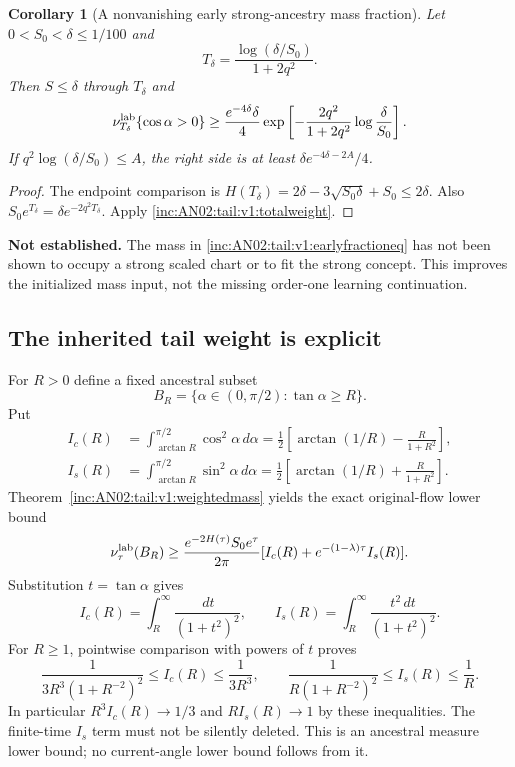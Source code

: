 \documentclass[11pt]{article}
\numberwithin{equation}{section}
\newtheorem{corollary}[theorem]{Corollary}
\theoremstyle{remark}\newtheorem{remark}[theorem]{Remark}
\newcommand{\dd}{\,d}
\newcommand{\1}{\mathbf 1}
\newcommand{\gap}[1]{\par\noindent\textbf{Not established.} #1\par\smallskip}
\begin{document}
\begin{corollary}[A nonvanishing early strong-ancestry mass fraction]
\label{inc:AN02:tail:v1:earlyfraction}
Let $0<S_0<\delta\le1/100$ and
\[
 T_\delta=\frac{\log(\delta/S_0)}{1+2q^2}.
\]
Then $S\le\delta$ through $T_\delta$ and
\begin{equation}\label{inc:AN02:tail:v1:earlyfractioneq}
 \nu_{T_\delta}^{\rm lab}\{\cos\alpha>0\}
 \ge\frac{e^{-4\delta}\delta}{4}
 \exp\left[-\frac{2q^2}{1+2q^2}\log\frac\delta{S_0}\right].
\end{equation}
If $q^2\log(\delta/S_0)\le A$, the right side is at least
$\delta e^{-4\delta-2A}/4$.
\end{corollary}
\begin{proof}
The endpoint comparison is
$H(T_\delta)=2\delta-3\sqrt{S_0\delta}+S_0\le2\delta$.
Also $S_0e^{T_\delta}=\delta e^{-2q^2T_\delta}$.
Apply \eqref{inc:AN02:tail:v1:totalweight}.
\end{proof}
\gap{The mass in \eqref{inc:AN02:tail:v1:earlyfractioneq} has not been shown
to occupy a strong scaled chart or to fit the strong concept. This improves
the initialized mass input, not the missing order-one learning continuation.}

\subsection{The inherited tail weight is explicit}
For $R>0$ define a fixed ancestral subset
\[
 B_R=\{\alpha\in(0,\pi/2):\tan\alpha\ge R\}.
\]
Put
\begin{align}
 I_c(R)&=\int_{\arctan R}^{\pi/2}\cos^2\alpha\dd\alpha
 =\frac12\left[\arctan(1/R)-\frac{R}{1+R^2}\right],\label{inc:AN02:tail:v1:Ic}\\
 I_s(R)&=\int_{\arctan R}^{\pi/2}\sin^2\alpha\dd\alpha
 =\frac12\left[\arctan(1/R)+\frac{R}{1+R^2}\right].\label{inc:AN02:tail:v1:Is}
\end{align}
Theorem~\ref{inc:AN02:tail:v1:weightedmass} yields the exact original-flow
lower bound
\begin{equation}\label{inc:AN02:tail:v1:ancestraltail}
 \nu_\tau^{\rm lab}(B_R)\ge
 \frac{e^{-2H(\tau)}S_0e^\tau}{2\pi}
 [I_c(R)+e^{-(1-\lambda)\tau}I_s(R)].
\end{equation}
Substitution $t=\tan\alpha$ gives
\[
 I_c(R)=\int_R^\infty\frac{\dd t}{(1+t^2)^2},\qquad
 I_s(R)=\int_R^\infty\frac{t^2\dd t}{(1+t^2)^2}.
\]
For $R\ge1$, pointwise comparison with powers of $t$ proves
\begin{equation}\label{inc:AN02:tail:v1:Itailbounds}
 \frac{1}{3R^3(1+R^{-2})^2}\le I_c(R)\le\frac{1}{3R^3},\qquad
 \frac{1}{R(1+R^{-2})^2}\le I_s(R)\le\frac1R.
\end{equation}
In particular $R^3I_c(R)\to1/3$ and $RI_s(R)\to1$ by these inequalities.
The finite-time $I_s$ term must not be silently deleted. This is an
ancestral measure lower bound; no current-angle lower bound follows from it.
\end{document}
